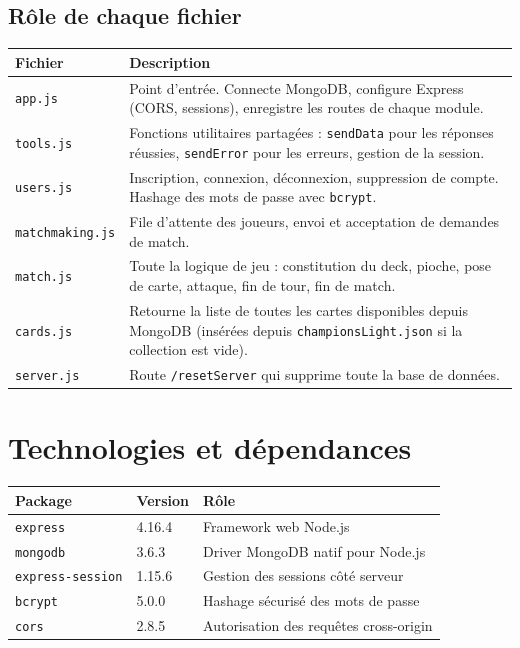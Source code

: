 \documentclass[12pt,a4paper]{article}
\begin{document}
\subsection{Rôle de chaque fichier}

\begin{tabularx}{\textwidth}{l X}
\toprule
\textbf{Fichier} & \textbf{Description} \\
\midrule
\texttt{app.js} & Point d'entrée. Connecte MongoDB, configure Express (CORS, sessions), enregistre les routes de chaque module. \\
\texttt{tools.js} & Fonctions utilitaires partagées : \texttt{sendData} pour les réponses réussies, \texttt{sendError} pour les erreurs, gestion de la session. \\
\texttt{users.js} & Inscription, connexion, déconnexion, suppression de compte. Hashage des mots de passe avec \texttt{bcrypt}. \\
\texttt{matchmaking.js} & File d'attente des joueurs, envoi et acceptation de demandes de match. \\
\texttt{match.js} & Toute la logique de jeu : constitution du deck, pioche, pose de carte, attaque, fin de tour, fin de match. \\
\texttt{cards.js} & Retourne la liste de toutes les cartes disponibles depuis MongoDB (insérées depuis \texttt{championsLight.json} si la collection est vide). \\
\texttt{server.js} & Route \texttt{/resetServer} qui supprime toute la base de données. \\
\bottomrule
\end{tabularx}

\section{Technologies et dépendances}

\begin{tabularx}{\textwidth}{l l X}
\toprule
\textbf{Package} & \textbf{Version} & \textbf{Rôle} \\
\midrule
\texttt{express} & 4.16.4 & Framework web Node.js \\
\texttt{mongodb} & 3.6.3 & Driver MongoDB natif pour Node.js \\
\texttt{express-session} & 1.15.6 & Gestion des sessions côté serveur \\
\texttt{bcrypt} & 5.0.0 & Hashage sécurisé des mots de passe \\
\texttt{cors} & 2.8.5 & Autorisation des requêtes cross-origin \\
\bottomrule
\end{tabularx}
\end{document}
